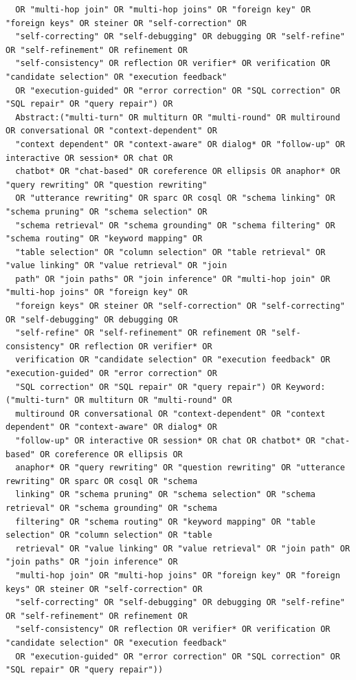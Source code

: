 \begin{lstlisting}
  OR "multi-hop join" OR "multi-hop joins" OR "foreign key" OR "foreign keys" OR steiner OR "self-correction" OR
  "self-correcting" OR "self-debugging" OR debugging OR "self-refine" OR "self-refinement" OR refinement OR
  "self-consistency" OR reflection OR verifier* OR verification OR "candidate selection" OR "execution feedback"
  OR "execution-guided" OR "error correction" OR "SQL correction" OR "SQL repair" OR "query repair") OR
  Abstract:("multi-turn" OR multiturn OR "multi-round" OR multiround OR conversational OR "context-dependent" OR
  "context dependent" OR "context-aware" OR dialog* OR "follow-up" OR interactive OR session* OR chat OR
  chatbot* OR "chat-based" OR coreference OR ellipsis OR anaphor* OR "query rewriting" OR "question rewriting"
  OR "utterance rewriting" OR sparc OR cosql OR "schema linking" OR "schema pruning" OR "schema selection" OR
  "schema retrieval" OR "schema grounding" OR "schema filtering" OR "schema routing" OR "keyword mapping" OR
  "table selection" OR "column selection" OR "table retrieval" OR "value linking" OR "value retrieval" OR "join
  path" OR "join paths" OR "join inference" OR "multi-hop join" OR "multi-hop joins" OR "foreign key" OR
  "foreign keys" OR steiner OR "self-correction" OR "self-correcting" OR "self-debugging" OR debugging OR
  "self-refine" OR "self-refinement" OR refinement OR "self-consistency" OR reflection OR verifier* OR
  verification OR "candidate selection" OR "execution feedback" OR "execution-guided" OR "error correction" OR
  "SQL correction" OR "SQL repair" OR "query repair") OR Keyword:("multi-turn" OR multiturn OR "multi-round" OR
  multiround OR conversational OR "context-dependent" OR "context dependent" OR "context-aware" OR dialog* OR
  "follow-up" OR interactive OR session* OR chat OR chatbot* OR "chat-based" OR coreference OR ellipsis OR
  anaphor* OR "query rewriting" OR "question rewriting" OR "utterance rewriting" OR sparc OR cosql OR "schema
  linking" OR "schema pruning" OR "schema selection" OR "schema retrieval" OR "schema grounding" OR "schema
  filtering" OR "schema routing" OR "keyword mapping" OR "table selection" OR "column selection" OR "table
  retrieval" OR "value linking" OR "value retrieval" OR "join path" OR "join paths" OR "join inference" OR
  "multi-hop join" OR "multi-hop joins" OR "foreign key" OR "foreign keys" OR steiner OR "self-correction" OR
  "self-correcting" OR "self-debugging" OR debugging OR "self-refine" OR "self-refinement" OR refinement OR
  "self-consistency" OR reflection OR verifier* OR verification OR "candidate selection" OR "execution feedback"
  OR "execution-guided" OR "error correction" OR "SQL correction" OR "SQL repair" OR "query repair"))
\end{lstlisting}

